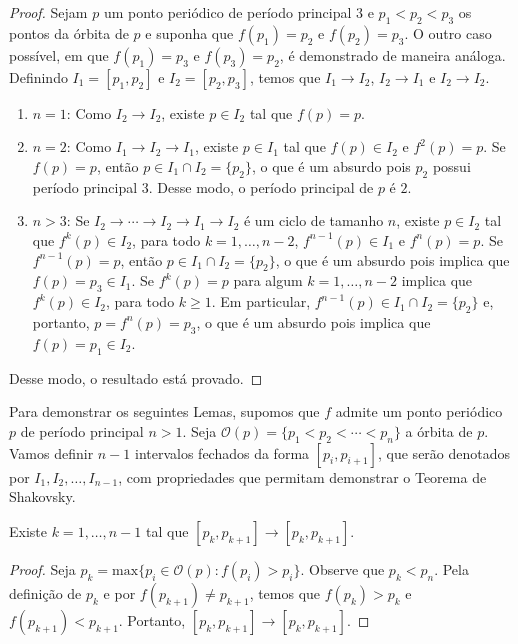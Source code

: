 \begin{proof}
Sejam $p$ um ponto periódico de período principal $3$ e $p_1 < p_2 < p_3$ os pontos da órbita de $p$ e suponha que $f(p_1) = p_2$ e $f(p_2) = p _3$. O outro caso possível, em que $f(p_1) = p_3$ e $f(p_3) = p_2$, é demonstrado de maneira análoga. Definindo $I_1 = [p_1, p_2]$ e $I_2 = [p_2, p_3]$, temos que $I_1 \longrightarrow I_2$, $I_2 \longrightarrow I_1$ e $I_2 \longrightarrow I_2$.
\begin{enumerate}[label=(\alph*)]
\item $n = 1$: Como $I_2 \longrightarrow I_2$, existe $p \in I_2$ tal que $f(p) = p$.
\item $n = 2$: Como $I_1 \longrightarrow I_2 \longrightarrow I_1$, existe $p \in I_1$ tal que $f(p) \in I_2$ e $f^2(p) = p$. Se $f(p) = p$, então $p \in I_1 \cap I_2 = \{p_2\}$, o que é um absurdo pois $p_2$ possui período principal 3. Desse modo, o período principal de $p$ é $2$.
\item $n > 3$: Se $I_2 \longrightarrow \cdots \longrightarrow I_2 \longrightarrow I_1 \longrightarrow I_2$ é um ciclo de tamanho $n$, existe $p \in I_2$ tal que $f^k(p) \in I_2$, para todo $k = 1, \dots, n-2$, $f^{n-1}(p) \in I_1$ e $f^n(p) = p$. Se $f^{n-1}(p) = p$, então $p \in I_1 \cap I_2 = \{p_2\}$, o que é um absurdo pois implica que $f(p) = p_3 \in I_1$. Se $f^k(p) = p$ para algum $k = 1, \dots, n-2$ implica que $f^k(p) \in I_2$, para todo $k \geq 1$. Em particular, $f^{n-1}(p) \in I_1 \cap I_2 = \{p_2\}$ e, portanto, $p = f^n(p) = p_3$, o que é um absurdo pois implica que $f(p) = p_1 \in I_2$. 
\end{enumerate}
Desse modo, o resultado está provado.
\end{proof}

Para demonstrar os seguintes Lemas, supomos que $f$ admite um ponto periódico $p$ de período principal $n > 1$. Seja $\mathcal{O}(p) = \{p_1 < p_2 < \cdots < p_n\}$ a órbita de $p$. Vamos definir $n-1$ intervalos fechados da forma $[p_i, p_{i+1}]$, que serão denotados por $I_1, I_2, \dots, I_{n-1}$, com propriedades que permitam demonstrar o Teorema de Shakovsky.

\begin{lemma}
Existe $k = 1, \dots, n-1$ tal que $[p_k, p_{k+1}] \longrightarrow [p_k, p_{k+1}]$.
\end{lemma}

\begin{proof}
Seja $p_k = \textrm{max}\{p_i \in \mathcal{O}(p) : f(p_i) > p_i\}$. Observe que $p_k < p_n$. Pela definição de $p_k$ e por $f(p_{k+1}) \neq p_{k+1}$, temos que $f(p_k) > p_k$ e $f(p_{k+1}) < p_{k+1}$. Portanto, $[p_k, p_{k+1}] \longrightarrow [p_k, p_{k+1}]$.
\end{proof}

